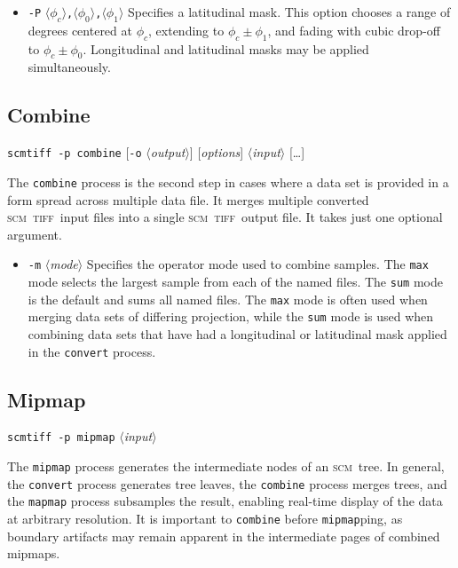 \documentclass[oneside,10pt]{memoir}
\newcommand{\scm}     {\textsc{scm}}
\newcommand{\tiff}    {\textsc{tiff}}
\newcommand{\scmtiff} {\texttt{scmtiff}}
\newcommand{\inangles}[1]{$\langle$#1$\rangle$}
\newenvironment{optionlist}
  {\setlength{\leftmargini}{1in}\begin{itemize}}{\end{itemize}}
\begin{document}
\begin{Spacing}{1.1}
\begin{optionlist}
\item[\texttt{-P} \inangles{$\phi_c$}\texttt{,}\inangles{$\phi_0$}\texttt{,}\inangles{$\phi_1$}] Specifies a latitudinal mask. This option chooses a range of degrees centered at $\phi_c$, extending to $\phi_c\pm\phi_1$, and fading with cubic drop-off to $\phi_c\pm\phi_0$. Longitudinal and latitudinal masks may be applied simultaneously.
\end{optionlist}

\subsection{Combine}

\noindent\scmtiff\ \texttt{-p combine} [\texttt{-o} \inangles{\textit{output}}] [\textit{options}] \inangles{\textit{input}} [\ldots]

\bigskip The \texttt{combine} process is the second step in cases where a data set is provided in a form spread across multiple data file. It merges multiple converted \scm\ \tiff\ input files into a single \scm\ \tiff\ output file. It takes just one optional argument.

\begin{optionlist}
\item[\texttt{-m} \inangles{\textit{mode}}] Specifies the operator mode used to combine samples. The \texttt{max} mode selects the largest sample from each of the named files. The \texttt{sum} mode is the default and sums all named files. The \texttt{max} mode is often used when merging data sets of differing projection, while the \texttt{sum} mode is used when combining data sets that have had a longitudinal or latitudinal mask applied in the \texttt{convert} process.
\end{optionlist}

\subsection{Mipmap}

\noindent\scmtiff\ \texttt{-p mipmap} \inangles{\textit{input}}

\bigskip The \texttt{mipmap} process generates the intermediate nodes of an \scm\ tree. In general, the \texttt{convert} process generates tree leaves, the \texttt{combine} process merges trees, and the \texttt{mapmap} process subsamples the result, enabling real-time display of the data at arbitrary resolution. It is important to \texttt{combine} before \texttt{mipmap}ping, as boundary artifacts may remain apparent in the intermediate pages of combined mipmaps.


\end{Spacing}
\end{document}
